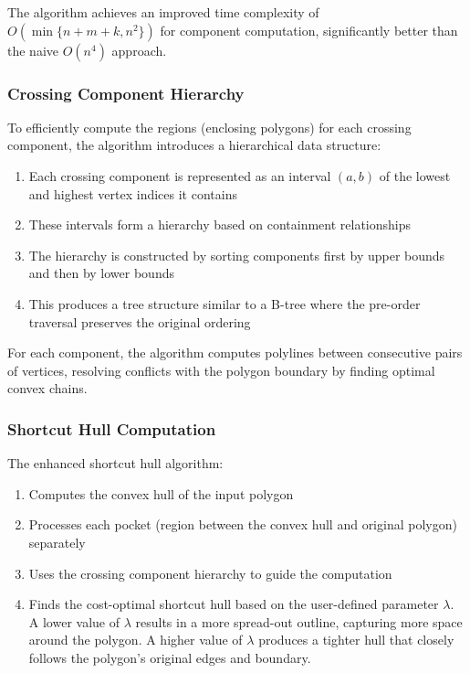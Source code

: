 \documentclass[11pt]{article}
\begin{document}
The algorithm achieves an improved time complexity of $O(\min\{n + m + k, n^2\})$ for component computation, significantly better than the naive $O(n^4)$ approach.

\subsubsection{Crossing Component Hierarchy}

To efficiently compute the regions (enclosing polygons) for each crossing component, the algorithm introduces a hierarchical data structure:
\begin{enumerate}
    \item Each crossing component is represented as an interval $(a, b)$ of the lowest and highest vertex indices it contains
    \item These intervals form a hierarchy based on containment relationships
    \item The hierarchy is constructed by sorting components first by upper bounds and then by lower bounds
    \item This produces a tree structure similar to a B-tree where the pre-order traversal preserves the original ordering
\end{enumerate}

For each component, the algorithm computes polylines between consecutive pairs of vertices, resolving conflicts with the polygon boundary by finding optimal convex chains.

\subsubsection{Shortcut Hull Computation}

The enhanced shortcut hull algorithm:
\begin{enumerate}
    \item Computes the convex hull of the input polygon
    \item Processes each pocket (region between the convex hull and original polygon) separately
    \item Uses the crossing component hierarchy to guide the computation
\item Finds the cost-optimal shortcut hull based on the user-defined parameter $\lambda$. A lower value of $\lambda$ results in a more spread-out outline, capturing more space around the polygon. A higher value of $\lambda$ produces a tighter hull that closely follows the polygon's original edges and boundary.

\end{enumerate}
\end{document}
